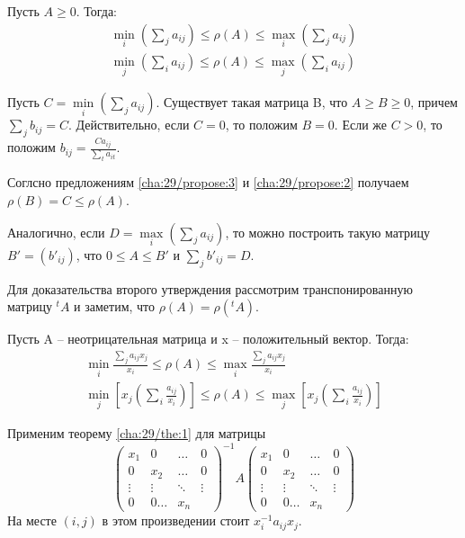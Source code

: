 \begin{theorem}[]\label{cha:29/the:1}
	Пусть $A \ge 0$. Тогда:
	$$\begin{gathered}
		\underset{i}{\min}\left( \underset{j}{\overset{}{\sum}}a_{ij} \right) \le \rho(A) \le \underset{i}{\max}\left( \underset{j}{\overset{}{\sum}}a_{ij} \right) \\
		\underset{j}{\min}\left( \underset{i}{\overset{}{\sum}}a_{ij} \right) \le \rho(A) \le \underset{j}{\max}\left( \underset{i}{\overset{}{\sum}}a_{ij} \right)
	\end{gathered}$$
\end{theorem}
\begin{Proof}
	Пусть $C = \underset{i}{\min}\left( \underset{j}{\overset{}{\sum}}a_{ij} \right)$. Существует такая матрица B, что $A \ge B \ge 0$, причем $\underset{j}{\overset{}{\sum}}b_{ij} = C$. Действительно, если $C = 0$, то положим $B = 0$. Если же $C > 0$, то положим $\displaystyle b_{ij} = \frac{C a_{ij}}{\underset{t}{\overset{}{\sum}}a_{it}}$.

	Соглсно предложениям \ref{cha:29/propose:3} и \ref{cha:29/propose:2} получаем $\rho(B) = C \le \rho(A)$.

	Аналогично, если $D = \underset{i}{\max}\left( \underset{j}{\overset{}{\sum}}a_{ij} \right)$, то можно построить такую матрицу $B' = (b'_{ij})$, что $0 \le A \le B'$ и $\underset{j}{\overset{}{\sum}}b'_{ij} = D$.

	Для доказательства второго утверждения рассмотрим транспонированную матрицу $^tA$ и заметим, что $\rho(A) = \rho(^tA)$.
\end{Proof}

\begin{conseq}[]\label{cha:29/conseq:1}
	Пусть A – неотрицательная матрица и x – положительный вектор. Тогда:
	$$\begin{gathered}
		\underset{i}{\min}\frac{\underset{j}{\overset{}{\sum}}a_{ij}x_j}{x_i} \le \rho(A) \le \underset{i}{\max}\frac{\underset{j}{\overset{}{\sum}}a_{ij}x_j}{x_i} \\
		\underset{j}{\min}\left[ x_j \left( \underset{i}{\overset{}{\sum}}\frac{a_{ij}}{x_i} \right) \right] \le \rho(A) \le \underset{j}{\max}\left[ x_j \left( \underset{i}{\overset{}{\sum}}\frac{a_{ij}}{x_i} \right) \right]
	\end{gathered}$$
\end{conseq}
\begin{Proof}
	Применим теорему \ref{cha:29/the:1} для матрицы
	$$\begin{pmatrix}
		x_1 & 0 & \dots & 0 \\ 
		0 & x_2 & \dots & 0 \\
		\vdots & \vdots & \ddots & \vdots \\
		0 & 0 \dots & x_n
	\end{pmatrix}^{-1} A \begin{pmatrix}
		x_1 & 0 & \dots & 0 \\ 
		0 & x_2 & \dots & 0 \\
		\vdots & \vdots & \ddots & \vdots \\
		0 & 0 \dots & x_n
	\end{pmatrix}$$
	На месте $(i,j)$ в этом произведении стоит $x_i^{−1}a_{ij}x_j$.
\end{Proof}

